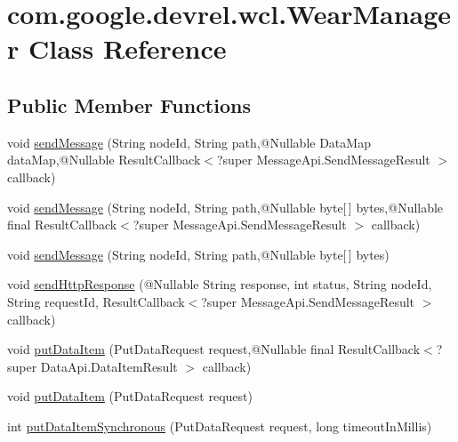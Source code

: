 \hypertarget{classcom_1_1google_1_1devrel_1_1wcl_1_1WearManager}{}\section{com.\+google.\+devrel.\+wcl.\+Wear\+Manager Class Reference}
\label{classcom_1_1google_1_1devrel_1_1wcl_1_1WearManager}
\subsection*{Public Member Functions}
\begin{DoxyCompactItemize}
\item 
void \hyperlink{classcom_1_1google_1_1devrel_1_1wcl_1_1WearManager_aaf40fd61737e8c52d95d593c85785aa7}{send\+Message} (String node\+Id, String path,@Nullable Data\+Map data\+Map,@Nullable Result\+Callback$<$?super Message\+Api.\+Send\+Message\+Result $>$ callback)
\item 
void \hyperlink{classcom_1_1google_1_1devrel_1_1wcl_1_1WearManager_aeb657bce26a4e7aca54627b51e550e87}{send\+Message} (String node\+Id, String path,@Nullable byte\mbox{[}$\,$\mbox{]} bytes,@Nullable final Result\+Callback$<$?super Message\+Api.\+Send\+Message\+Result $>$ callback)
\item 
void \hyperlink{classcom_1_1google_1_1devrel_1_1wcl_1_1WearManager_a00d603c9084c1a4870252d31f352910f}{send\+Message} (String node\+Id, String path,@Nullable byte\mbox{[}$\,$\mbox{]} bytes)
\item 
void \hyperlink{classcom_1_1google_1_1devrel_1_1wcl_1_1WearManager_a0bb216530bb18fb38af13e62f839673c}{send\+Http\+Response} (@Nullable String response, int status, String node\+Id, String request\+Id, Result\+Callback$<$?super Message\+Api.\+Send\+Message\+Result $>$ callback)
\item 
void \hyperlink{classcom_1_1google_1_1devrel_1_1wcl_1_1WearManager_ac84d14877f2d3db172625477ee8944e5}{put\+Data\+Item} (Put\+Data\+Request request,@Nullable final Result\+Callback$<$?super Data\+Api.\+Data\+Item\+Result $>$ callback)
\item 
void \hyperlink{classcom_1_1google_1_1devrel_1_1wcl_1_1WearManager_a9a0d60e2ac7035253d20ae3b2ad7e85c}{put\+Data\+Item} (Put\+Data\+Request request)
\item 
int \hyperlink{classcom_1_1google_1_1devrel_1_1wcl_1_1WearManager_a0a1d005ca8c26515d89fe8377feb41c3}{put\+Data\+Item\+Synchronous} (Put\+Data\+Request request, long timeout\+In\+Millis)

\end{DoxyCompactItemize}

